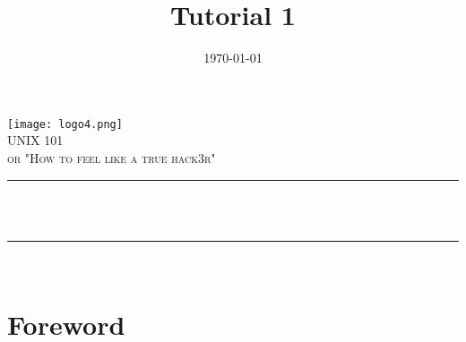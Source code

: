 \documentclass[12pt]{article}
\title{Tutorial 1}								%
\date{\today}											%
\makeatletter
\let\thetitle\@title
\let\thedate\@date
\makeatother
\begin{document}

\begin{titlepage}
	\centering
    \vspace*{0.5 cm}
    \texttt{[image: logo4.png]}\\[1.0 cm]
    \textsc{\LARGE \newline\newline UNIX 101}\\[2.0 cm]
	\textsc{\Large or "How to feel like a true hack3r"}\\[0.5 cm]
	\rule{\linewidth}{0.2 mm} \\[0.4 cm]
	{ \huge \bfseries \thetitle}\\
	\rule{\linewidth}{0.2 mm} \\[1.5 cm]
	
%           
%        
	
	
    \thedate
    
    
    
	
\end{titlepage}


\tableofcontents
\pagebreak


\section{Foreword}
\end{document}
